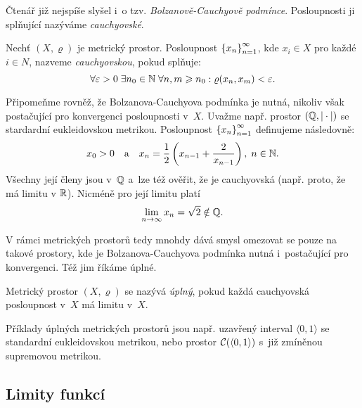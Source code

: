 Čtenář již nejspíše slyšel i~o tzv. \emph{Bolzanově-Cauchyově podmínce}. Posloupnosti ji splňující nazýváme \emph{cauchyovské}.
\begin{definition}\label{def:cauchyovska-posloupnost}
    Nechť $(X,\varrho)$ je metrický prostor. Posloupnost $\left\{x_n\right\}_{n=1}^\infty$, kde $x_i\in X$ pro každé $i\in N$, nazveme \emph{cauchyovskou}, pokud splňuje:
    \[\forall\varepsilon>0\;\exists n_0\in\mathbb{N}\;\forall n,m\geqslant n_0:\varrho(x_n,x_m)<\varepsilon.\]
\end{definition}
Připomeňme rovněž, že Bolzanova-Cauchyova podmínka je nutná, nikoliv však postačující pro konvergenci posloupnosti v~$X$. Uvažme např. prostor $(\mathbb{Q},|\cdot|)$ se stardardní eukleidovskou metrikou. Posloupnost $\left\{x_n\right\}_{n=1}^\infty$ definujeme následovně:
\[x_0>0\quad\text{a}\quad x_n=\dfrac{1}{2}\left(x_{n-1}+\dfrac{2}{x_{n-1}}\right),\;n\in\mathbb{N}.\]
Všechny její členy jsou v~$\mathbb{Q}$ a~lze též ověřit, že je cauchyovská (např. proto, že má limitu v $\mathbb{R}$). Nicméně pro její limitu platí
\[\lim_{n\to\infty}x_n=\sqrt{2}\notin\mathbb{Q}.\]

V rámci metrických prostorů tedy mnohdy dává smysl omezovat se pouze na takové prostory, kde je Bolzanova-Cauchyova podmínka nutná i~postačující pro konvergenci. Též jim říkáme úplné.
\begin{definition}\label{def:uplny-mp}
    Metrický prostor $(X,\varrho)$ se nazývá \emph{úplný}, pokud každá cauchyovská posloupnost v~$X$ má limitu v~$X$.
\end{definition}
Příklady úplných metrických prostorů jsou např. uzavřený interval $\langle0,1\rangle$ se standardní eukleidovskou metrikou, nebo prostor $\mathcal{C}(\langle0,1\rangle)$ s~již zmíněnou supremovou metrikou.

\subsection{Limity funkcí}\label{subsec:limity-fci}

